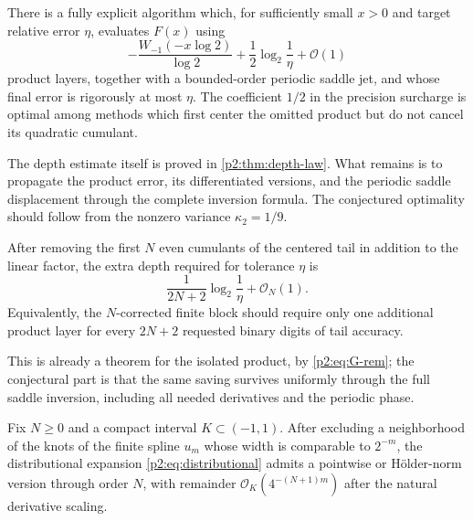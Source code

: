 \documentclass[11pt,oneside]{article}
\numberwithin{equation}{section}
\theoremstyle{definition}
\theoremstyle{remark}
\newcommand{\bigO}{\mathcal O}
\begin{document}
\begin{conjecture}
\label{p2:conj:endpoint-evaluator}
There is a fully explicit algorithm which, for sufficiently small $x>0$ and target relative
error $\eta$, evaluates $F(x)$ using
\begin{equation}
 -\frac{W_{-1}(-x\log2)}{\log2}
 +\frac12\log_2\frac1\eta+\bigO(1)
 \label{p2:eq:conj-depth}
\end{equation}
product layers, together with a bounded-order periodic saddle jet, and whose final error is
rigorously at most $\eta$.  The coefficient $1/2$ in the precision surcharge is optimal among
methods which first center the omitted product but do not cancel its quadratic cumulant.
\end{conjecture}

The depth estimate itself is proved in \cref{p2:thm:depth-law}.  What remains is to propagate the
product error, its differentiated versions, and the periodic saddle displacement through the
complete inversion formula.  The conjectured optimality should follow from the nonzero
variance $\kappa_2=1/9$.

\begin{conjecture}
\label{p2:conj:cumulant-depth}
After removing the first $N$ even cumulants of the centered tail in addition to the linear
factor, the extra depth required for tolerance $\eta$ is
\begin{equation}
 \frac{1}{2N+2}\log_2\frac1\eta+\bigO_N(1).
 \label{p2:eq:cumulant-depth-conj}
\end{equation}
Equivalently, the $N$-corrected finite block should require only one additional product layer
for every $2N+2$ requested binary digits of tail accuracy.
\end{conjecture}

This is already a theorem for the isolated product, by \eqref{p2:eq:G-rem}; the conjectural part
is that the same saving survives uniformly through the full saddle inversion, including all
needed derivatives and the periodic phase.

\begin{conjecture}
\label{p2:conj:strong-spline}
Fix $N\ge0$ and a compact interval $K\subset(-1,1)$.  After excluding a neighborhood of the
knots of the finite spline $u_m$ whose width is comparable to $2^{-m}$, the distributional
expansion \eqref{p2:eq:distributional} admits a pointwise or Hölder-norm version through order
$N$, with remainder $\bigO_K(4^{-(N+1)m})$ after the natural derivative scaling.
\end{conjecture}
\end{document}
